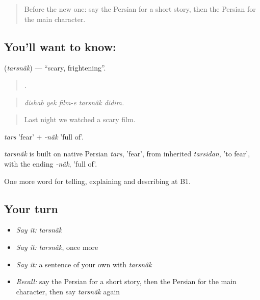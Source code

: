\label{lesson:FA-C530-tarsnak}



\begin{quote}
Before the new one: say the Persian for a short story, then the Persian for the main character.
\end{quote}

\subsection*{You'll want to know: }
\textbf{} (\emph{tarsnâk}) — \textquotedblleft{}scary, frightening\textquotedblright{}.

\begin{quote}
    .
\end{quote}

\begin{quote}
\emph{dishab yek film-e tarsnâk didim.}
\end{quote}

\begin{quote}
Last night we watched a scary film.
\end{quote}

\emph{tars} 'fear' + \emph{-nâk} 'full of'.

\begin{cousinweb}
\emph{tarsnâk} is built on native Persian \emph{tars}, 'fear', from inherited \emph{tarsidan}, 'to fear', with the ending \emph{-nâk}, 'full of'.
\end{cousinweb}

\begin{grammarlens}[title={What you've built}]
One more word for telling, explaining and describing at B1.
\end{grammarlens}

\subsection*{Your turn}
\begin{itemize}
\raggedright
  \item \emph{Say it:} \emph{tarsnâk}
  \item \emph{Say it:} \emph{tarsnâk}, once more
  \item \emph{Say it:} a sentence of your own with \emph{tarsnâk}
  \item \emph{Recall:} say the Persian for a short story, then the Persian for the main character, then say \emph{tarsnâk} again
\end{itemize}

